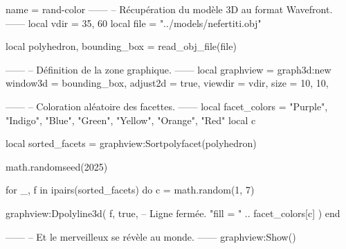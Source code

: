 \documentclass{standalone}
\begin{document}
\begin{luadraw}{name = rand-color}
------
-- Récupération du modèle 3D au format Wavefront.
------
local vdir = {35, 60}
local file = "../models/nefertiti.obj"

local polyhedron, bounding_box = read_obj_file(file)

------
-- Définition de la zone graphique.
------
local graphview = graph3d:new{
  window3d = bounding_box,
  adjust2d = true,
  viewdir  = vdir,
  size     = {10, 10},
}

------
-- Coloration aléatoire des facettes.
------
local facet_colors = {"Purple", "Indigo", "Blue", "Green", "Yellow", "Orange", "Red"}
local c

local sorted_facets = graphview:Sortpolyfacet(polyhedron)

math.randomseed(2025)

for _, f in ipairs(sorted_facets) do
  c = math.random(1, 7)

  graphview:Dpolyline3d(
    f,
    true,  -- Ligne fermée.
    "fill = " .. facet_colors[c]
  )
end

------
-- Et le merveilleux se révèle au monde.
------
graphview:Show()
\end{luadraw}
\end{document}
